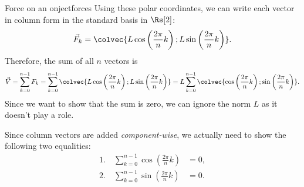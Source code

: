 \begin{example}{Force on an onject}{forces}
  Using these polar coordinates, we can write each vector in column form in the standard basis in $\Rs[2]$:
  \[
    \vec{F}_{k} = \colvec{L\cos\left(\frac{2\pi}{n}k\right);L\sin\left(\frac{2\pi}{n}k\right)}.
  \]
  Therefore, the sum of all $n$ vectors is
  \[
    \vec{V} = \sum\limits_{k=0}^{n-1}F_{k} = \sum\limits_{k=0}^{n-1}\colvec{L\cos\left(\frac{2\pi}{n}k\right);L\sin\left(\frac{2\pi}{n}k\right)} = L\sum\limits_{k=0}^{n-1}\colvec{\cos\left(\frac{2\pi}{n}k\right);\sin\left(\frac{2\pi}{n}k\right)}.
  \]
  Since we want to show that the sum is zero, we can ignore the norm $L$ as it doesn't play a role.

  Since column vectors are added \textit{component-wise}, we actually need to show the following two equalities:
  \begin{align*}
    1.\quad\sum\limits_{k=0}^{n-1}\cos\left(\frac{2\pi}{n}k\right) &= 0,\\
    2.\quad\sum\limits_{k=0}^{n-1}\sin\left(\frac{2\pi}{n}k\right) &= 0.
  \end{align*}


\end{example}
